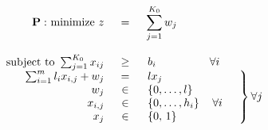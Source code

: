 \begin{displaymath}
\begin{array}{rcl}
\mathbf{P:}\ \mathrm{minimize\ }z&=&\displaystyle{\sum_{j=1}^{K_{0}}w_{j}}\\
&&\\
\begin{array}{r@{}}
\mathrm{subject\ to\ }\sum_{j=1}^{K_{0}}x_{ij}
\end{array}&
\begin{array}{c}
\geq
\end{array}&
\left.\begin{array}{@{}l}
b_{i}
\end{array}\right.\qquad\qquad\forall i\\
\begin{array}{r@{}}
\sum_{i=1}^{m}l_{i}x_{i,j}+w_{j}\\
w_{j}\\
x_{i,j}\\
x_{j}
\end{array}&
\begin{array}{c}
=\\
\in\\
\in\\
\in
\end{array}&
\left.\begin{array}{@{}l}
lx_{j}\\
\left\{0,\ldots,l\right\}\\
\left\{0,\ldots,h_{i}\right\}\quad\forall i\\
\left\{0,\,1\right\}
\end{array}\quad\right\}\forall j
\end{array}
\end{displaymath}
